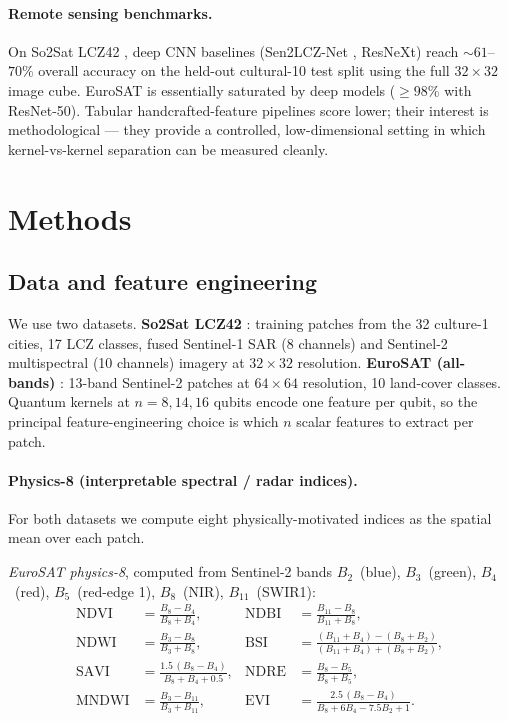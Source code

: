 \documentclass[pdflatex,sn-mathphys-num]{sn-jnl}
\theoremstyle{thmstyleone}
\theoremstyle{thmstyletwo}
\theoremstyle{thmstylethree}
\begin{document}
\paragraph{Remote sensing benchmarks.}
On So2Sat LCZ42 \cite{zhu2020}, deep CNN baselines (Sen2LCZ-Net
\cite{qiu2020}, ResNeXt) reach $\sim\!61$--$70\%$ overall accuracy on the
held-out cultural-10 test split using the full $32\!\times\!32$ image
cube. EuroSAT \cite{helber2019} is essentially saturated by deep models
($\ge 98\%$ with ResNet-50). Tabular handcrafted-feature pipelines
score lower; their interest is methodological --- they provide a
controlled, low-dimensional setting in which kernel-vs-kernel separation
can be measured cleanly.

\section{Methods}\label{sec:methods}

\subsection{Data and feature engineering}\label{sec:features}
We use two datasets. \textbf{So2Sat LCZ42} \cite{zhu2020}: training
patches from the 32 culture-1 cities, 17 LCZ classes, fused
Sentinel-1 SAR (8 channels) and Sentinel-2 multispectral (10 channels)
imagery at $32{\times}32$ resolution. \textbf{EuroSAT (all-bands)}
\cite{helber2019}: 13-band Sentinel-2 patches at $64{\times}64$
resolution, 10 land-cover classes. Quantum kernels at $n=8,14,16$
qubits encode one feature per qubit, so the principal feature-engineering
choice is which $n$ scalar features to extract per patch.

\paragraph{Physics-8 (interpretable spectral / radar indices).}
For both datasets we compute eight physically-motivated indices as the
spatial mean over each patch.

\noindent \emph{EuroSAT physics-8}, computed from Sentinel-2 bands
$B_2$~(blue), $B_3$~(green), $B_4$~(red), $B_5$~(red-edge 1),
$B_8$~(NIR), $B_{11}$~(SWIR1):
\begin{align*}
\mathrm{NDVI}  &= \frac{B_8 - B_4}{B_8 + B_4}, &
\mathrm{NDBI}  &= \frac{B_{11} - B_8}{B_{11} + B_8}, \\
\mathrm{NDWI}  &= \frac{B_3 - B_8}{B_3 + B_8}, &
\mathrm{BSI}   &= \frac{(B_{11}+B_4) - (B_8+B_2)}{(B_{11}+B_4) + (B_8+B_2)}, \\
\mathrm{SAVI}  &= \frac{1.5\,(B_8 - B_4)}{B_8 + B_4 + 0.5}, &
\mathrm{NDRE}  &= \frac{B_8 - B_5}{B_8 + B_5}, \\
\mathrm{MNDWI} &= \frac{B_3 - B_{11}}{B_3 + B_{11}}, &
\mathrm{EVI}   &= \frac{2.5\,(B_8 - B_4)}{B_8 + 6 B_4 - 7.5 B_2 + 1}.
\end{align*}
\end{document}

